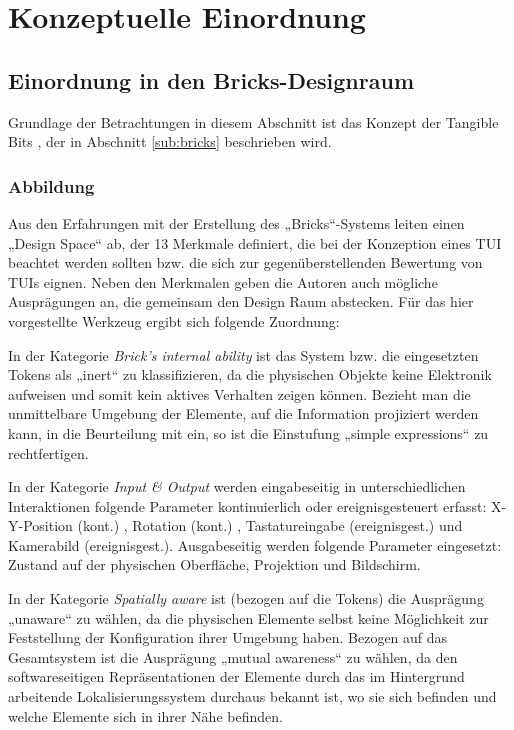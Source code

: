\chapter{Konzeptuelle Einordnung} %
\label{cha:konzeptuelle_evaluierung}

\section{Einordnung in den Bricks-Designraum} %
\label{sec:einordnung_in_den_bricks_designraum}

Grundlage der Betrachtungen in diesem Abschnitt ist das Konzept der Tangible Bits \citep{Fitzmaurice95}, der in Abschnitt \ref{sub:bricks} beschrieben wird.

\subsection{Abbildung} 

Aus den Erfahrungen mit der Erstellung des „Bricks“-Systems leiten \citet{Fitzmaurice95} einen  „Design Space“ ab, der 13 Merkmale definiert, die bei der Konzeption eines \gls{TUI} beachtet werden sollten bzw. die sich zur gegenüberstellenden Bewertung von \glspl{TUI} eignen. Neben den Merkmalen geben die Autoren auch mögliche Ausprägungen an, die gemeinsam den Design Raum abstecken. Für das hier vorgestellte Werkzeug ergibt sich folgende Zuordnung:

In der Kategorie \emph{Brick's internal ability} ist das System bzw. die eingesetzten Tokens als „inert“ zu klassifizieren, da die physischen Objekte keine Elektronik aufweisen und somit kein aktives Verhalten zeigen können. Bezieht man die unmittelbare Umgebung der Elemente, auf die Information projiziert werden kann, in die Beurteilung mit ein, so ist die Einstufung „simple expressions“ zu rechtfertigen. 

In der Kategorie \emph{Input \& Output} werden eingabeseitig in unterschiedlichen Interaktionen folgende Parameter kontinuierlich oder ereignisgesteuert erfasst: X-Y-Position (kont.) , Rotation (kont.) , Tastatureingabe (ereignisgest.) und Kamerabild (ereignisgest.). Ausgabeseitig werden folgende Parameter eingesetzt: Zustand auf der physischen Oberfläche, Projektion und Bildschirm.

In der Kategorie \emph{Spatially aware} ist (bezogen auf die Tokens) die Ausprägung „unaware“ zu wählen, da die physischen Elemente selbst keine Möglichkeit zur Feststellung der Konfiguration ihrer Umgebung haben. Bezogen auf das Gesamtsystem ist die Ausprägung „mutual awareness“ zu wählen, da den softwareseitigen Repräsentationen der Elemente durch das im Hintergrund arbeitende Lokalisierungssystem durchaus bekannt ist, wo sie sich befinden und welche Elemente sich in ihrer Nähe befinden.

